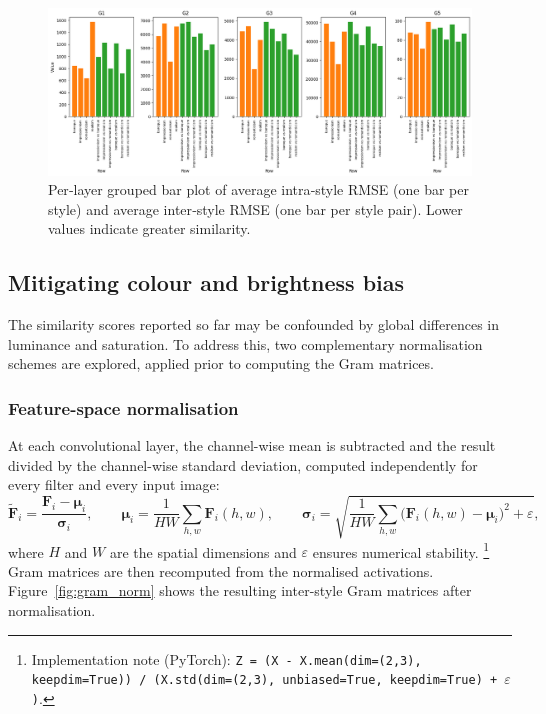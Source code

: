 \documentclass[a4paper,11pt]{article}
\begin{document}
\begin{figure}[htbp]
    \centering
    \includegraphics[width=\textwidth]{figures/barplot_RMSE.png}
    \caption{Per‐layer grouped bar plot of average intra‐style RMSE (one bar per style) and average inter‐style RMSE (one bar per style pair). Lower values indicate greater similarity.}
    \label{fig:rmse_barplot}
\end{figure}

\subsection{Mitigating colour and brightness bias}\label{sec:norm_experiments}
The similarity scores reported so far may be confounded by global differences in luminance and saturation.  
To address this, two complementary normalisation schemes are explored, applied prior to computing the Gram matrices.

\subsubsection{Feature-space normalisation}
At each convolutional layer, the channel-wise mean is subtracted and the result divided by the channel-wise standard deviation, computed independently for every filter and every input image:
\begin{equation}
  \tilde{\mathbf{F}}_{i}=\frac{\mathbf{F}_{i}-\boldsymbol{\mu}_{i}}{\boldsymbol{\sigma}_{i}},
  \qquad
  \boldsymbol{\mu}_{i}=\textstyle\frac{1}{HW}\sum_{h,w}\mathbf{F}_{i}(h,w),
  \qquad
  \boldsymbol{\sigma}_{i}=\sqrt{\frac{1}{HW}\sum_{h,w}\bigl(\mathbf{F}_{i}(h,w)-\boldsymbol{\mu}_{i}\bigr)^{2}+\varepsilon},
  \label{eq:featnorm}
\end{equation}
where \(H\) and \(W\) are the spatial dimensions and \(\varepsilon\) ensures numerical stability.
\footnote{Implementation note (PyTorch):
\texttt{Z = (X - X.mean(dim=(2,3), keepdim=True)) / (X.std(dim=(2,3), unbiased=True, keepdim=True) + $\varepsilon$)}.}
Gram matrices are then recomputed from the normalised activations. Figure~\ref{fig:gram_norm} shows the resulting inter-style Gram matrices after normalisation.
\end{document}
